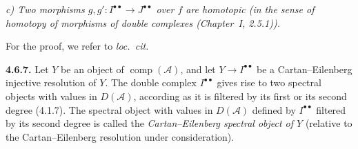 \noindent\textit{c) Two morphisms
$g,g'\colon I^{\bullet\bullet}\longrightarrow J^{\bullet\bullet}$
over $f$ are homotopic (in the sense of homotopy of morphisms of double
complexes (Chapter~I, 2.5.1)).}

For the proof, we refer to \emph{loc.\ cit.}

\medskip\noindent\textbf{4.6.7.}\quad
Let $Y$ be an object of $\operatorname{comp}(\mathcal A)$, and let
$Y\longrightarrow I^{\bullet\bullet}$ be a Cartan--Eilenberg injective
resolution of $Y$. The double complex $I^{\bullet\bullet}$ gives rise to
two spectral objects with values in $D(\mathcal A)$, according as it is
filtered by its first or its second degree (4.1.7). The spectral object
with values in $D(\mathcal A)$ defined by $I^{\bullet\bullet}$ filtered by
its second degree is called the \emph{Cartan--Eilenberg spectral object of
$Y$} (relative to the Cartan--Eilenberg resolution under consideration).
\endgroup
